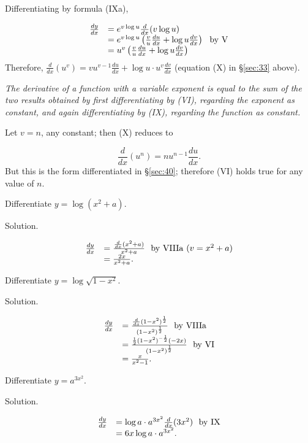 Differentiating by formula (IXa),

\[
\begin{array}{ll}
  	\frac{dy}{dx} &	= e^{v \log u} \frac{d}{dx} (v \log u)\\
  &	= e^{v \log u} \left ( \frac{v}{u} \frac{du}{dx} + \log u \frac{dv}{dx} \right ) \ \ {\rm by\ V}\\
  &	= u^v \left ( \frac{v}{u} \frac{du}{dx} + \log u \frac{dv}{dx} \right )
\end{array}
\]
Therefore, $\frac{d}{dx}(u^v) 	= vu^{v - 1}\frac{du}{dx} + \log u \cdot u^v \frac{dv}{dx}$
(equation (X) in \S \ref{sec:33}  above).

{\it The derivative of a function with a variable exponent is equal to the 
sum of the two results obtained by first differentiating by (VI), 
regarding the exponent as constant, and again differentiating by (IX), 
regarding the function as constant.}

Let $v = n$, any constant; then (X) reduces to

\[
    \frac{d}{dx}(u^n) = nu^{n - 1} \frac{du}{dx}.
\]
But this is the form differentiated in \S \ref{sec:40}; %
therefore (VI) holds true for any value of $n$.

\begin{example}
{\rm
Differentiate $y = \log(x^2 + a)$.

Solution. 	

\[
\begin{array}{ll}
\frac{dy}{dx} 	&= \frac{\frac{d}{dx}(x^2 + a)}{x^2 + a} \ \ {\rm by\ VIIIa}\ (v = x^2 + a)\\
  	&= \frac{2x}{x^2 + a} .
\end{array}
\]
}
\end{example}

\begin{example}
\label{ex:2-46}
{\rm
Differentiate $y = \log \sqrt{1 - x^2}$.


Solution. 

\[
\begin{array}{ll}
	\frac{dy}{dx} 
&	= \frac{\frac{d}{dx}(1 - x^2)^{\frac{1}{2}}}{(1 - x^2)^{\frac{1}{2}}} \ \ {\rm by\ VIIIa}\\
&  	= \frac{\frac{1}{2} (1 - x^2)^{-\frac{1}{2}}(-2x)}{(1 - x^2)^{\frac{1}{2}}} \ \ {\rm by\ VI}\\
&  	= \frac{x}{x^2 - 1}.
\end{array}
\]
}
\end{example}

\begin{example}
{\rm
Differentiate $y = a^{3x^2}$.

Solution.

\[
\begin{array}{ll}
 	\frac{dy}{dx} &	= \log a \cdot a^{3x^2} \frac{d}{dx}(3 x^2) \ \ {\rm by\ IX}\\
  &	= 6x \log a \cdot a^{3x^2}.
\end{array}
\]
}
\end{example}

